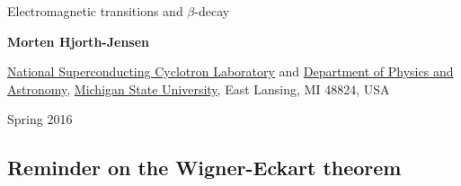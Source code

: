 \documentclass[%
oneside,                 %
final,                   %
10pt]{article}
\begin{document}

\newcommand{\exercisesection}[1]{\subsection*{#1}}






\thispagestyle{empty}

\begin{center}
{\LARGE\bf
\begin{spacing}{1.25}
Electromagnetic transitions and $\beta$-decay
\end{spacing}
}
\end{center}


\begin{center}
{\bf Morten Hjorth-Jensen}
\end{center}

    \begin{center}
\centerline{{\small \href{{http://www.nscl.msu.edu/}}{National Superconducting Cyclotron Laboratory} and \href{{https://www.pa.msu.edu/}}{Department of Physics and Astronomy}, \href{{http://www.msu.edu/}}{Michigan State University}, East Lansing, MI 48824, USA}}
\end{center}
    

\begin{center}
Spring 2016
\end{center}

\vspace{1cm}


\subsection{Reminder on the Wigner-Eckart theorem}

\end{document}
